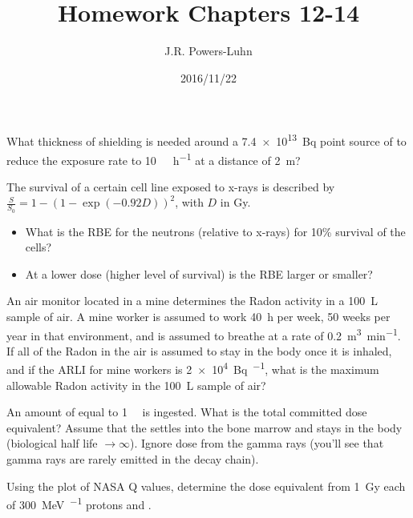 \documentclass{hw}
\author{J.R. Powers-Luhn}
\date{2016/11/22}
\title{Homework Chapters 12-14}
\begin{document}
\problem{}
What thickness of  shielding is needed around a \SI{7.4e13}{\becquerel} point source of  to reduce the exposure rate to \SI{10}{\milli\rem\per\hour} at a distance of \SI{2}{\meter}?

\solution

\problem{}
The survival of a certain cell line exposed to x-rays is described by $\frac{S}{S_0} = 1 - \left(1 - \exp\left(-0.92 D\right) \right)^2$, with $D$ in \si{\gray}.
\begin{itemize}
    \item What is the RBE for the neutrons (relative to x-rays) for 10\% survival of the cells?
    \item At a lower dose (higher level of survival) is the RBE larger or smaller?
\end{itemize}

\solution

\problem{}
An air monitor located in a mine determines the Radon activity in a \SI{100}{\liter} sample of air. A mine worker is assumed to work \SI{40}{\hour} per week, 50 weeks per year in that environment, and is assumed to breathe at a rate of \SI{0.2}{\meter^3\per\minute}. If all of the Radon in the air is assumed to stay in the body once it is inhaled, and if the ARLI for mine workers is \SI{2e4}{\becquerel\per\year}, what is the maximum allowable Radon activity in the \SI{100}{\liter} sample of air?

\solution

\problem{}
An amount of  equal to \SI{1}{\micro\curie} is ingested. What is the total committed dose equivalent? Assume that the  settles into the bone marrow and stays in the body (biological half life $\longrightarrow\infty$). Ignore dose from the gamma rays (you'll see that gamma rays are rarely emitted in the  decay chain).

\solution

\problem{}
Using the plot of NASA Q values, determine the dose equivalent from \SI{1}{\gray} each of \SI{300}{\mega\electronvolt\per\nucleon} protons and .

\solution
\end{document}
